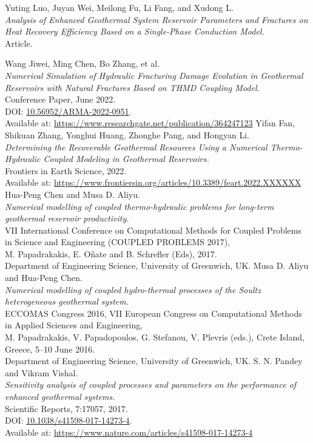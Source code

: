 \documentclass[a4paper,12pt]{report}
\begin{document}
\begin{thebibliography}{10}
  Yuting Luo, Juyan Wei, Meilong Fu, Li Fang, and Xudong L.\\
  \textit{Analysis of Enhanced Geothermal System Reservoir Parameters and Fractures on Heat Recovery Efficiency Based on a Single-Phase Conduction Model.}\\
  Article.

  Wang Jiwei, Ming Chen, Bo Zhang, et al.\\
  \textit{Numerical Simulation of Hydraulic Fracturing Damage Evolution in Geothermal Reservoirs with Natural Fractures Based on THMD Coupling Model.}\\ 
  Conference Paper, June 2022.\\
  DOI: \href{https://doi.org/10.56952/ARMA-2022-0951}{10.56952/ARMA-2022-0951}.\\
  Available at: \url{https://www.researchgate.net/publication/364247123}
  Yifan Fan, Shikuan Zhang, Yonghui Huang, Zhonghe Pang, and Hongyan Li.\\
  \textit{Determining the Recoverable Geothermal Resources Using a Numerical Thermo-Hydraulic Coupled Modeling in Geothermal Reservoirs.}\\
  Frontiers in Earth Science, 2022.\\
  Available at: \url{https://www.frontiersin.org/articles/10.3389/feart.2022.XXXXXX}
  Hua-Peng Chen and Musa D. Aliyu.\\
  \textit{Numerical modelling of coupled thermo-hydraulic problems for long-term geothermal reservoir productivity.}\\
  VII International Conference on Computational Methods for Coupled Problems in Science and Engineering (COUPLED PROBLEMS 2017),\\
  M. Papadrakakis, E. Oñate and B. Schrefler (Eds), 2017.\\
  Department of Engineering Science, University of Greenwich, UK.
  Musa D. Aliyu and Hua-Peng Chen.\\
  \textit{Numerical modelling of coupled hydro-thermal processes of the Soultz heterogeneous geothermal system.}\\
  ECCOMAS Congress 2016, VII European Congress on Computational Methods in Applied Sciences and Engineering,\\
  M. Papadrakakis, V. Papadopoulos, G. Stefanou, V. Plevris (eds.), Crete Island, Greece, 5–10 June 2016.\\
  Department of Engineering Science, University of Greenwich, UK.
  S. N. Pandey and Vikram Vishal.\\
  \textit{Sensitivity analysis of coupled processes and parameters on the performance of enhanced geothermal systems.}\\
  Scientific Reports, 7:17057, 2017.\\
  DOI: \href{https://doi.org/10.1038/s41598-017-14273-4}{10.1038/s41598-017-14273-4}.\\
  Available at: \url{https://www.nature.com/articles/s41598-017-14273-4}
\end{thebibliography}
\end{document}
